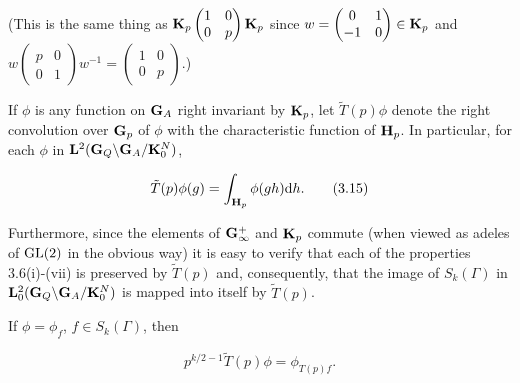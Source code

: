 (This is the same thing as $\mathbf{K}_p\begin{pmatrix} 1 & 0 \\ 0 & p \end{pmatrix}\mathbf{K}_p$ since $w = \begin{pmatrix} 0 & 1 \\ -1 & 0 \end{pmatrix} \in \mathbf{K}_p$ and $w\begin{pmatrix} p & 0 \\ 0 & 1 \end{pmatrix}w^{-1} = \begin{pmatrix} 1 & 0 \\ 0 & p \end{pmatrix}$.)

If $\phi$ is any function on $\mathbf{G}_A$ right invariant by $\mathbf{K}_p$, let $\tilde{T}(p)\phi$ denote the right convolution over $\mathbf{G}_p$ of $\phi$ with the characteristic function of $\mathbf{H}_p$. In particular, for each $\phi$ in $\mathbf{L}^2(\mathbf{G}_Q\backslash\mathbf{G}_A/\mathbf{K}_0^N)$,

\begin{equation}\label{eq:3.15}
\tilde{T}(p)\phi(g) = \int_{\mathbf{H}_p}\phi(gh)\mathrm{d} h.\tag{3.15}
\end{equation}

Furthermore, since the elements of $\mathbf{G}_\infty^+$ and $\mathbf{K}_p$ commute (when viewed as adeles of $\operatorname{GL}(2)$ in the obvious way) it is easy to verify that each of the properties 3.6(i)-(vii) is preserved by $\tilde{T}(p)$ and, consequently, that the image of $S_k(\Gamma)$ in $\mathbf{L}_0^2(\mathbf{G}_Q\backslash\mathbf{G}_A/\mathbf{K}_0^N)$ is mapped into itself by $\tilde{T}(p)$.

\begin{lemma}\label{lem:3.7}

If $\phi = \phi_f$, $f \in S_k(\Gamma)$, then

\[
p^{k/2-1}\tilde{T}(p)\phi = \phi_{T(p)f}.
\]

\end{lemma}

